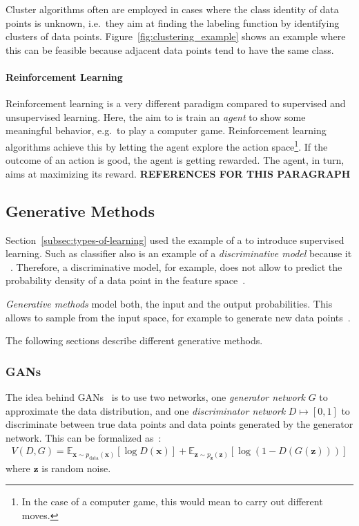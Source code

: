 Cluster algorithms often are employed in cases where the class identity of data points is unknown, i.e.~they aim at finding the labeling function by identifying clusters of data points.
Figure~\ref{fig:clustering_example} shows an example where this can be feasible because adjacent data points tend to have the same class.

\paragraph{Reinforcement Learning}
Reinforcement learning is a very different paradigm compared to supervised and unsupervised learning.
Here, the aim to is train an \textit{agent} to show some meaningful behavior, e.g.~to play a computer game.
Reinforcement learning algorithms achieve this by letting the agent explore the action space\footnote{In the case of a computer game, this would mean to carry out different moves.}.
If the outcome of an action is good, the agent is getting rewarded.
The agent, in turn, aims at maximizing its reward. \textbf{REFERENCES FOR THIS PARAGRAPH}

\subsection{Generative Methods}\label{subsec:generative-methods}

Section~\ref{subsec:types-of-learning} used the example of a  to introduce supervised learning.
Such as classifier also is an example of a \textit{discriminative model} because it ~\citep[p. 43]{bishop2006pattern}.
Therefore, a discriminative model, for example, does not allow to predict the probability density of a data point in the feature space~\citep[pp. 43,44]{bishop2006pattern}.

\textit{Generative methods} model both, the input and the output probabilities.
This allows to sample from the input space, for example to generate new data points~\citep[p. 43]{bishop2006pattern}.

The following sections describe different generative methods.

\subsubsection{\acfp{GAN}}\label{subsubsec:gans}

The idea behind \acp{GAN}~\citep{goodfellow2014gans} is to use two networks, one \textit{generator network} $G$ to approximate the data distribution, and one \textit{discriminator network} $D \mapsto [0, 1]$ to discriminate between true data points and data points generated by the generator network.
This can be formalized as~\citep{goodfellow2014gans}:
\begin{align}
    V(D, G)=\mathbb{E}_{\bm{x} \sim p_{\text{data}}(\bm{x})}[\log D(\bm{x})]+\mathbb{E}_{\bm{z} \sim p_{\bm{z}}(\bm{z})}[\log (1-D(G(\bm{z})))]
\end{align}
where $\bm{z}$ is random noise.

